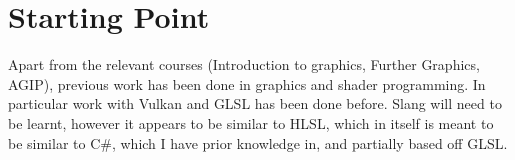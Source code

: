 \section*{Starting Point}

Apart from the relevant courses (Introduction to graphics, Further
Graphics, AGIP),
previous work has been done in graphics and shader programming. In particular
work with Vulkan and GLSL has been done before. Slang will need to be learnt,
however it appears to be similar to HLSL, which in itself is meant to be similar
to C\#, which I have prior knowledge in, and partially based off GLSL.
